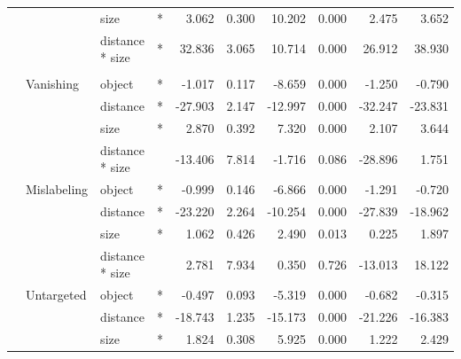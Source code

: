 \documentclass[
]{article}
\begin{document}
\begin{longtable}[t]{llllrrrrrr}
\cmidrule{3-10}\nopagebreak
\hspace{1em} &  & size & * & 3.062 & 0.300 & 10.202 & 0.000 & 2.475 & 3.652\\
\cmidrule{3-10}\nopagebreak
\hspace{1em} &  & distance * size & * & 32.836 & 3.065 & 10.714 & 0.000 & 26.912 & 38.930\\
\cmidrule{1-10}\pagebreak[0]
\addlinespace[0.3em]
\multicolumn{10}{l}{\textbf{Faster R-CNN}}\\
\hspace{1em} & Vanishing & object & * & -1.017 & 0.117 & -8.659 & 0.000 & -1.250 & -0.790\\
\cmidrule{3-10}\nopagebreak
\hspace{1em} &  & distance & * & -27.903 & 2.147 & -12.997 & 0.000 & -32.247 & -23.831\\
\cmidrule{3-10}\nopagebreak
\hspace{1em} &  & size & * & 2.870 & 0.392 & 7.320 & 0.000 & 2.107 & 3.644\\
\cmidrule{3-10}\nopagebreak
\hspace{1em} &  & distance * size &  & -13.406 & 7.814 & -1.716 & 0.086 & -28.896 & 1.751\\
\cmidrule{2-10}\nopagebreak
\hspace{1em} & Mislabeling & object & * & -0.999 & 0.146 & -6.866 & 0.000 & -1.291 & -0.720\\
\cmidrule{3-10}\nopagebreak
\hspace{1em} &  & distance & * & -23.220 & 2.264 & -10.254 & 0.000 & -27.839 & -18.962\\
\cmidrule{3-10}\nopagebreak
\hspace{1em} &  & size & * & 1.062 & 0.426 & 2.490 & 0.013 & 0.225 & 1.897\\
\cmidrule{3-10}\nopagebreak
\hspace{1em} &  & distance * size &  & 2.781 & 7.934 & 0.350 & 0.726 & -13.013 & 18.122\\
\cmidrule{2-10}\nopagebreak
\hspace{1em} & Untargeted & object & * & -0.497 & 0.093 & -5.319 & 0.000 & -0.682 & -0.315\\
\cmidrule{3-10}\nopagebreak
\hspace{1em} &  & distance & * & -18.743 & 1.235 & -15.173 & 0.000 & -21.226 & -16.383\\
\cmidrule{3-10}\nopagebreak
\hspace{1em} &  & size & * & 1.824 & 0.308 & 5.925 & 0.000 & 1.222 & 2.429\\

\end{longtable}
\end{document}

